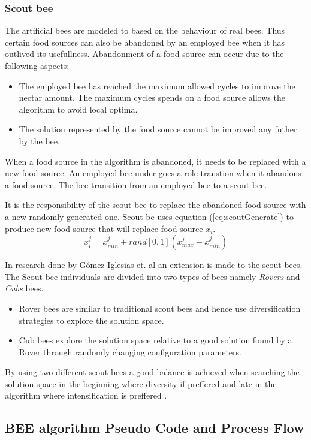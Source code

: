 \subsubsection{Scout bee}
The artificial bees are modeled to based on the behaviour of real bees. Thus certain food sources can also be abandoned by an employed bee when it has outlived its usefullness. Abandonment of a food source can occur due to the following aspects:
\begin{itemize}
\item The employed bee has reached the maximum allowed cycles to improve the nectar amount. The maximum cycles spends on a food source allows the algorithm to avoid local optima.
\item The solution represented by the food source cannot be improved any futher by the bee.
\end{itemize}
When a food source in the algorithm is abandoned, it needs to be replaced with a new food source. An employed bee under goes a role transtion when it abandons a food source. The bee transition from an employed bee to a scout bee. 

It is the responsibility of the scout bee to replace the abandoned food source with a new randomly generated one. Scout be uses equation (\ref{eq:scoutGenerate}) to produce new food source that will replace food source $x_i$.
\begin{equation}
\label{eq:scoutGenerate}
x^j_i = x^j_{min} + rand[0,1](x^j_{max} - x^j_{min})
\end{equation}

In research done by G\'{o}mez-Iglesias et. al \cite{ABCFusionGrid} an extension is made to the scout bees. The Scout bee individuals are divided into two types of bees namely \emph{Rovers} and \emph{Cubs} bees\cite{ABCFusionGrid}.
\begin{itemize}
\item{Rover bees} are similar to traditional scout bees and hence use diversification strategies to explore the solution space. 
\item {Cub bees} explore the solution space relative to a good solution found by a Rover through randomly changing configuration parameters. 
\end{itemize}
By using two different scout bees a good balance is achieved when searching the solution space in the beginning where diversity if preffered and late in the algorithm where intensification is preffered \cite{ABCFusionGrid}.
\subsection{BEE algorithm Pseudo Code and Process Flow}

